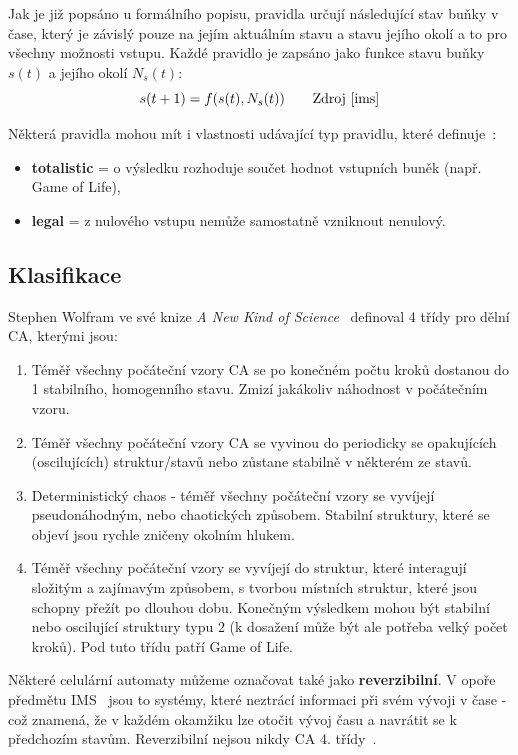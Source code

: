 Jak je již popsáno u formálního popisu, pravidla určují následující stav buňky v čase, který je závislý pouze na jejím aktuálním stavu a stavu jejího okolí a to pro všechny možnosti vstupu. Každé pravidlo je zapsáno jako funkce stavu buňky ${s(t)}$ a jejího okolí ${N_s(t)}$:
\begin{equation*}
s(t + 1) = f(s(t), N_s(t)) \tag*{Zdroj \cite{ims}}
\end{equation*}

Některá pravidla mohou mít i vlastnosti udávající typ pravidlu, které definuje~\cite{mechanics-CA}:
\begin{itemize}
    \item \textbf{totalistic} = o výsledku rozhoduje součet hodnot vstupních buněk (např. Game of Life),
    \item \textbf{legal} = z nulového vstupu nemůže samostatně vzniknout nenulový.
\end{itemize}

\subsection*{Klasifikace}
Stephen Wolfram ve své knize \textit{A New Kind of Science}~\cite{wolfram-NewKindOfScience} definoval 4 třídy pro dělní CA, kterými jsou:
\begin{enumerate}
    \item Téměř všechny počáteční vzory CA se po konečném počtu kroků dostanou do 1 stabilního, homogenního stavu. Zmizí jakákoliv náhodnost v počátečním vzoru.
    \item Téměř všechny počáteční vzory CA se vyvinou do periodicky se opakujících (oscilujících) struktur/stavů nebo zůstane stabilně v některém ze stavů.
    \item Deterministický chaos - téměř všechny počáteční vzory se vyvíjejí pseudonáhodným, nebo chaotických způsobem. Stabilní struktury, které se objeví jsou rychle zničeny okolním hlukem.
    \item Téměř všechny počáteční vzory se vyvíjejí do struktur, které interagují složitým a zajímavým způsobem, s tvorbou místních struktur, které jsou schopny přežít po dlouhou dobu. Konečným výsledkem mohou být stabilní nebo oscilující struktury typu 2 (k dosažení může být ale potřeba velký počet kroků). Pod tuto třídu patří Game of Life.
\end{enumerate}

Některé celulární automaty můžeme označovat také jako \textbf{reverzibilní}. V opoře předmětu IMS~\cite{ims} jsou to systémy, které neztrácí informaci při svém vývoji v čase - což znamená, že v každém okamžiku lze otočit vývoj času a navrátit se k předchozím stavům. Reverzibilní nejsou nikdy CA 4. třídy~\cite{ims}.

